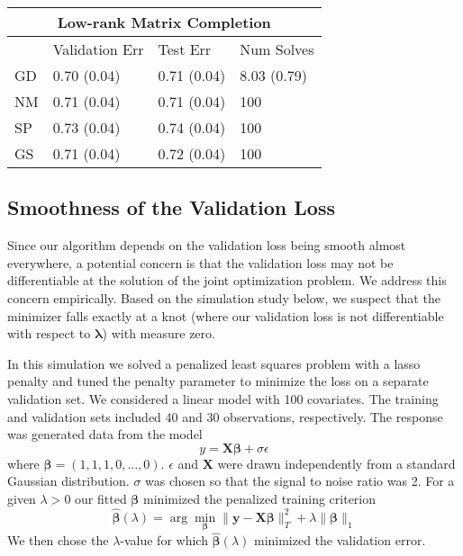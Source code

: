 \documentclass[12pt,letterpaper]{article}
\begin{document}
\begin{table}
	\begin{tabular}{| l | l | l | l |}
		\hline
		\multicolumn{4}{|c|}{Low-rank Matrix Completion}\\
		\hline
		& Validation Err & Test Err &  Num Solves\\
		\hline
		GD  & 0.70 (0.04) &  0.71 (0.04) & 8.03 (0.79) \\
		\hline
		NM & 0.71 (0.04) & 0.71 (0.04) & 100 \\
		\hline
		SP & 0.73 (0.04) & 0.74 (0.04) & 100\\
		\hline
		GS & 0.71 (0.04) & 0.72 (0.04) & 100\\
		\hline
	\end{tabular}
	
\end{table}

\subsection{Smoothness of the Validation Loss}

Since our algorithm depends on the validation loss being smooth almost everywhere, a potential concern is that the validation loss may not be differentiable at the solution of the joint optimization problem. We address this concern empirically. Based on the simulation study below, we suspect that the minimizer falls exactly at a knot (where our validation loss is not differentiable with respect to $\boldsymbol{\lambda}$) with measure zero. 

In this simulation we solved a penalized least squares problem with a lasso penalty and tuned the penalty parameter to minimize the loss on a separate validation set. We considered a linear model with 100 covariates. The training and validation sets included 40 and 30 observations, respectively. The response was generated data from the model
$$
y = \boldsymbol{X}\boldsymbol{\beta} + \sigma\epsilon
$$
where $\boldsymbol{\beta} = (1, 1, 1, 0, ..., 0)$. $\epsilon$ and $\boldsymbol{X}$ were drawn independently from a standard Gaussian distribution. $\sigma$ was chosen so that the signal to noise ratio was 2. For a given $\lambda>0$ our fitted $\boldsymbol{\beta}$ minimized the penalized training criterion
$$
\boldsymbol{\hat{\beta}}(\lambda) = \arg\min_{\boldsymbol{\beta}} \| \boldsymbol{y} - \boldsymbol{X}\boldsymbol{\beta} \|_T^2 + \lambda \|\boldsymbol{\beta}\|_1
$$
We then chose the $\lambda$-value for which $\boldsymbol{\hat{\beta}}(\lambda)$ minimized the validation error.
\end{document}
